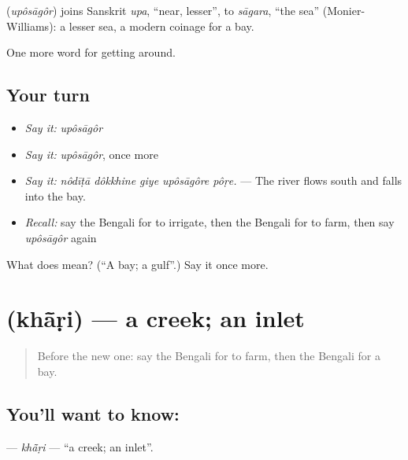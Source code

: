 \begin{cousinweb}
\textbf{} (\emph{upôsāgôr}) joins Sanskrit \emph{upa}, \textquotedblleft{}near, lesser\textquotedblright{}, to \emph{sāgara}, \textquotedblleft{}the sea\textquotedblright{} (Monier-Williams): a lesser sea, a modern coinage for a bay.
\end{cousinweb}

\begin{grammarlens}[title={What you've built}]
One more word for getting around.
\end{grammarlens}

\subsection*{Your turn}
\begin{itemize}
\raggedright
  \item \emph{Say it:} \emph{upôsāgôr}
  \item \emph{Say it:} \emph{upôsāgôr}, once more
  \item \emph{Say it:} \emph{nôdīṭā dôkkhine giye upôsāgôre pôṛe.} — The river flows south and falls into the bay.
  \item \emph{Recall:} say the Bengali for to irrigate, then the Bengali for to farm, then say \emph{upôsāgôr} again
\end{itemize}

\begin{tcolorbox}[breakable,colback=teal!4,colframe=teal!35!black,title={Before you move on}]
What does  mean? (\textquotedblleft{}A bay; a gulf\textquotedblright{}.) Say it once more.
\end{tcolorbox}
\section[\texorpdfstring{\bn{খাঁড়ি} (khā̃ṛi)}{খাঁড়ি (khā̃ṛi)}]{ (khā̃ṛi) — a creek; an inlet}

\label{lesson:BN-C431-khari}



\begin{quote}
Before the new one: say the Bengali for to farm, then the Bengali for a bay.
\end{quote}

\subsection*{You'll want to know: }
\textbf{} — \emph{khā̃ṛi} — \textquotedblleft{}a creek; an inlet\textquotedblright{}.

